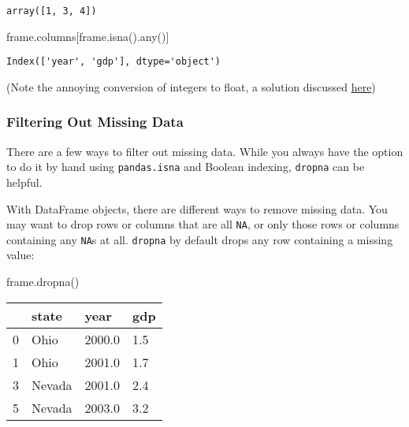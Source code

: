 \documentclass[
  letterpaper,
  DIV=11,
  numbers=noendperiod]{scrreprt}
\newenvironment{Shaded}{\begin{snugshade}}{\end{snugshade}}
\newcommand{\BuiltInTok}[1]{\textcolor[rgb]{0.00,0.23,0.31}{#1}}
\newcommand{\NormalTok}[1]{\textcolor[rgb]{0.00,0.23,0.31}{#1}}
\begin{document}
\begin{verbatim}
array([1, 3, 4])
\end{verbatim}

\begin{Shaded}
\begin{Highlighting}[]
\NormalTok{frame.columns[frame.isna().}\BuiltInTok{any}\NormalTok{()]}
\end{Highlighting}
\end{Shaded}

\begin{verbatim}
Index(['year', 'gdp'], dtype='object')
\end{verbatim}

(Note the annoying conversion of integers to float, a solution discussed
\href{https://pandas.pydata.org/pandas-docs/stable/user_guide/integer_na.html}{here})

\hypertarget{filtering-out-missing-data}{%
\subsubsection{Filtering Out Missing
Data}\label{filtering-out-missing-data}}

There are a few ways to filter out missing data. While you always have
the option to do it by hand using \texttt{pandas.isna} and Boolean
indexing, \texttt{dropna} can be helpful.

With DataFrame objects, there are different ways to remove missing data.
You may want to drop rows or columns that are all \texttt{NA}, or only
those rows or columns containing any \texttt{NA}s at all.
\texttt{dropna} by default drops any row containing a missing value:

\begin{Shaded}
\begin{Highlighting}[]
\NormalTok{frame.dropna()}
\end{Highlighting}
\end{Shaded}

\begin{longtable}[]{@{}llll@{}}
\toprule()
& state & year & gdp \\
\midrule()
\endhead
0 & Ohio & 2000.0 & 1.5 \\
1 & Ohio & 2001.0 & 1.7 \\
3 & Nevada & 2001.0 & 2.4 \\
5 & Nevada & 2003.0 & 3.2 \\
\bottomrule()
\end{longtable}
\end{document}
